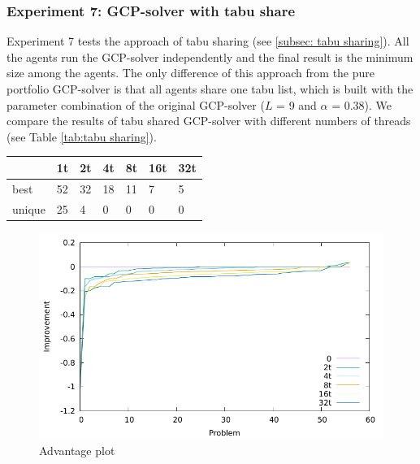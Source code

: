 \documentclass[12pt,a4paper,twoside]{scrartcl}
\numberwithin{equation}{section}
\begin{document}
\subsubsection{Experiment 7: GCP-solver with tabu share}
\label{sec:Experiment 7}
Experiment 7 tests the approach of tabu sharing (see \ref{subsec: tabu sharing}). All the agents run the GCP-solver independently and the final result is the minimum size among the agents. The only difference of this approach from the pure portfolio GCP-solver is that all agents share one tabu list, which is built with the parameter combination of the original GCP-solver ($L$ = 9 and $\alpha$ = 0.38). We compare the results of tabu shared GCP-solver with different numbers of threads (see Table \ref{tab:tabu sharing}).
\begin{table}[h!]
\begin{center}
    \begin{tabular}{| l |l| l | l|l|l|p{1cm}|}
\hline
&1t&2t&4t&8t&16t&32t\\ \hline
best& 52&32&18&11&7&5\\ \hline
unique&25&4&0&0&0&0\\ \hline
    \end{tabular}
\end{center}
\end{table}
\begin{figure}[h!]
\centering
  \includegraphics[scale = 1]{Experiments/E7/imp/impro.pdf}
      \caption{Advantage plot }
\end{figure} 
\end{document}
